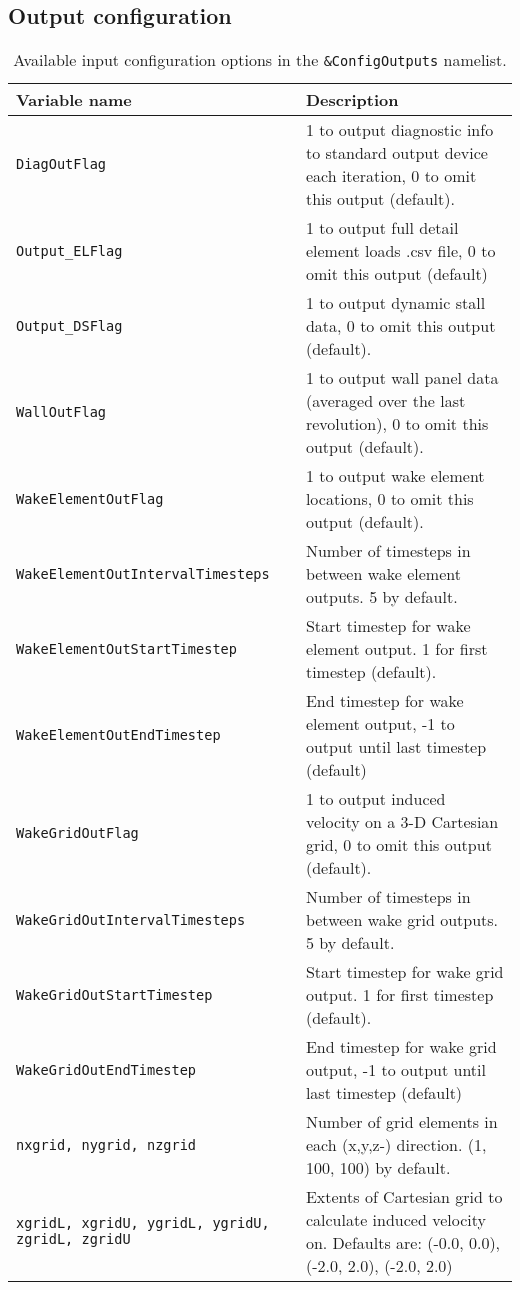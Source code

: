 \subsection{Output configuration}
\begin{longtable}{p{}p{}}
\caption{Available input configuration options in the \texttt{\&ConfigOutputs} namelist.} \label{tbl:configoutputs} \\
\toprule
Variable name & Description \\ \midrule
\texttt{DiagOutFlag}                     & 1 to output diagnostic info to standard output device each iteration, 0 to omit this output (default). \\
\texttt{Output\_ELFlag}                  & 1 to output full detail element loads .csv file, 0 to omit this output (default) \\
\texttt{Output\_DSFlag}                  & 1 to output dynamic stall data, 0 to omit this output (default). \\
\texttt{WallOutFlag}                     & 1 to output wall panel data (averaged over the last revolution), 0 to omit this output (default). \\
\texttt{WakeElementOutFlag}              & 1 to output wake element locations, 0 to omit this output (default). \\
\texttt{WakeElementOutIntervalTimesteps} & Number of timesteps in between wake element outputs. 5 by default. \\
\texttt{WakeElementOutStartTimestep}     & Start timestep for wake element output. 1 for first timestep (default). \\
\texttt{WakeElementOutEndTimestep}       & End timestep for wake element output, -1 to output until last timestep (default) \\
\texttt{WakeGridOutFlag}                 & 1 to output induced velocity on a 3-D Cartesian grid, 0 to omit this output (default). \\
\texttt{WakeGridOutIntervalTimesteps}    & Number of timesteps in between wake grid outputs. 5 by default. \\
\texttt{WakeGridOutStartTimestep}        & Start timestep for wake grid output. 1 for first timestep (default). \\
\texttt{WakeGridOutEndTimestep}          & End timestep for wake grid output, -1 to output until last timestep (default) \\
\texttt{nxgrid, nygrid, nzgrid}          & Number of grid elements in each (x,y,z-) direction. (1, 100, 100) by default. \\
\texttt{xgridL, xgridU, ygridL, ygridU, zgridL, zgridU}                 & Extents of Cartesian grid to calculate induced velocity on. Defaults are: (-0.0, 0.0), (-2.0, 2.0), (-2.0, 2.0) \\
\bottomrule
\end{longtable}

